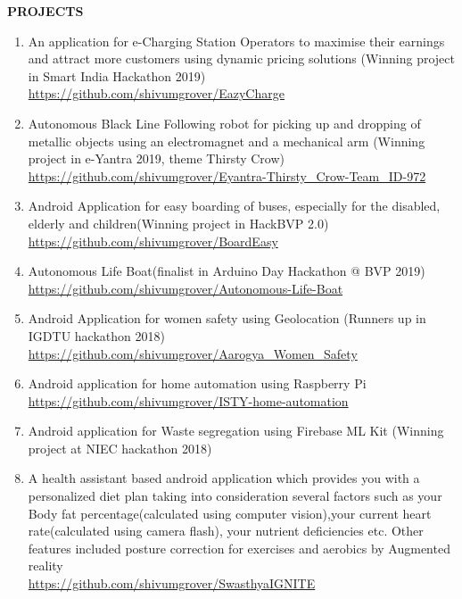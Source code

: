\documentclass[10pt]{article}
\begin{document}
\begin{minipage}{\textwidth}
\vspace{5mm}
\begin{huge}
\textbf{\color{theme}PROJECTS}
\end{huge}
\begin{mdframed}[backgroundcolor=theme]
\end{mdframed}

\vspace{1mm}

\color{black}\normalsize{{
\begin{enumerate}
\item\color{black} An application for e-Charging Station Operators to maximise their earnings and attract more customers using dynamic pricing solutions (Winning project in Smart India Hackathon 2019)\\
	\color{capri}\url{https://github.com/shivumgrover/EazyCharge}
\color{black} \item  Autonomous Black Line Following robot for picking up and dropping of metallic objects using an electromagnet and a mechanical arm (Winning project in e-Yantra 2019, theme Thirsty Crow)\\
 	\color{capri}\url{ https://github.com/shivumgrover/Eyantra-Thirsty_Crow-Team_ID-972}

\color{black} \item  Android Application for easy boarding of buses, especially for the disabled, elderly and children(Winning project in HackBVP 2.0)\\
	\color{capri}\url{https://github.com/shivumgrover/BoardEasy}
	
 \color{black} \item  Autonomous Life Boat(finalist in Arduino Day Hackathon @ BVP 2019)\\
	\color{capri}\url{https://github.com/shivumgrover/Autonomous-Life-Boat}
 \color{black} \item  Android Application for women safety using Geolocation (Runners up in IGDTU hackathon 2018)
	\color{capri}\url{https://github.com/shivumgrover/Aarogya_Women_Safety}
	
\color{black} \item  Android application for home automation using Raspberry Pi\\
	\color{capri}\url{https://github.com/shivumgrover/ISTY-home-automation}

\color{black} \item  Android application for Waste segregation using Firebase ML Kit (Winning project at NIEC hackathon 2018)
\color{black} \item  A health assistant based android application which provides you with a personalized diet plan taking into consideration several factors such as your Body fat percentage(calculated using computer vision),your current heart rate(calculated using camera flash), your nutrient deficiencies etc. Other features included posture correction for exercises and aerobics by Augmented reality\\
	\color{capri}\url{https://github.com/shivumgrover/SwasthyaIGNITE}


\end{enumerate}}}
\end{minipage}
\end{document}
